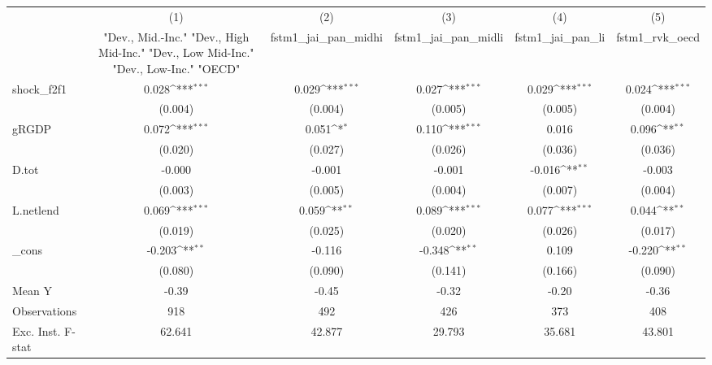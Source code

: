 {
\def\sym#1{\ifmmode^{#1}\else\(^{#1}\)\fi}
\begin{tabular}{l*{5}{c}}
\toprule
            &\multicolumn{1}{c}{(1)}&\multicolumn{1}{c}{(2)}&\multicolumn{1}{c}{(3)}&\multicolumn{1}{c}{(4)}&\multicolumn{1}{c}{(5)}\\
            &\multicolumn{1}{c}{ "Dev., Mid.-Inc." "Dev., High Mid-Inc." "Dev., Low Mid-Inc." "Dev., Low-Inc." "OECD" }&\multicolumn{1}{c}{fstm1\_jai\_pan\_midhi}&\multicolumn{1}{c}{fstm1\_jai\_pan\_midli}&\multicolumn{1}{c}{fstm1\_jai\_pan\_li}&\multicolumn{1}{c}{fstm1\_rvk\_oecd}\\
\midrule
shock\_f2f1  &       0.028\sym{***}&       0.029\sym{***}&       0.027\sym{***}&       0.029\sym{***}&       0.024\sym{***}\\
            &     (0.004)         &     (0.004)         &     (0.005)         &     (0.005)         &     (0.004)         \\
\addlinespace
gRGDP       &       0.072\sym{***}&       0.051\sym{*}  &       0.110\sym{***}&       0.016         &       0.096\sym{**} \\
            &     (0.020)         &     (0.027)         &     (0.026)         &     (0.036)         &     (0.036)         \\
\addlinespace
D.tot       &      -0.000         &      -0.001         &      -0.001         &      -0.016\sym{**} &      -0.003         \\
            &     (0.003)         &     (0.005)         &     (0.004)         &     (0.007)         &     (0.004)         \\
\addlinespace
L.netlend   &       0.069\sym{***}&       0.059\sym{**} &       0.089\sym{***}&       0.077\sym{***}&       0.044\sym{**} \\
            &     (0.019)         &     (0.025)         &     (0.020)         &     (0.026)         &     (0.017)         \\
\addlinespace
\_cons      &      -0.203\sym{**} &      -0.116         &      -0.348\sym{**} &       0.109         &      -0.220\sym{**} \\
            &     (0.080)         &     (0.090)         &     (0.141)         &     (0.166)         &     (0.090)         \\
\midrule
Mean Y      &       -0.39         &       -0.45         &       -0.32         &       -0.20         &       -0.36         \\
Observations&         918         &         492         &         426         &         373         &         408         \\
Exc. Inst. F-stat&      62.641         &      42.877         &      29.793         &      35.681         &      43.801         \\
\bottomrule
\end{tabular}
}
